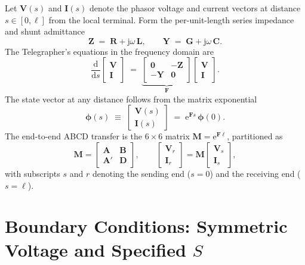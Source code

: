 \documentclass[11pt,a4paper]{article}
\newcommand{\jj}{\mathrm{j}}
\newcommand{\ee}{\mathrm{e}}
\newcommand{\diff}{\mathrm{d}}
\newcommand{\matZ}{\bm{Z}}
\newcommand{\matY}{\bm{Y}}
\newcommand{\matR}{\bm{R}}
\newcommand{\matL}{\bm{L}}
\newcommand{\matC}{\bm{C}}
\newcommand{\matG}{\bm{G}}
\newcommand{\matA}{\bm{A}}
\newcommand{\matB}{\bm{B}}
\newcommand{\matD}{\bm{D}}
\newcommand{\matM}{\bm{M}}
\newcommand{\matF}{\bm{F}}
\newcommand{\vV}{\bm{V}}
\newcommand{\vI}{\bm{I}}
\newcommand{\vphi}{\bm{\phi}}
\newcommand{\zeroM}{\bm{0}}
\begin{document}
Let \(\vV(s)\) and \(\vI(s)\) denote the phasor voltage and current vectors
at distance \(s\in[0,\ell]\) from the local terminal. Form the per-unit-length
series impedance and shunt admittance
\begin{equation}
\matZ \;=\; \matR + \jj\omega\,\matL,\qquad
\matY \;=\; \matG + \jj\omega\,\matC.
\end{equation}
The Telegrapher's equations in the frequency domain are
\begin{equation}
\frac{\diff}{\diff s}\!
\begin{bmatrix}\vV\\[2pt]\vI\end{bmatrix}
\;=\;
\underbrace{\begin{bmatrix}\zeroM & -\matZ \\[2pt] -\matY & \zeroM\end{bmatrix}}_{\matF}
\begin{bmatrix}\vV\\[2pt]\vI\end{bmatrix}.
\label{eq:state-space}
\end{equation}
The state vector at any distance follows from the matrix exponential
\begin{equation}
\vphi(s)\;\equiv\;\begin{bmatrix}\vV(s)\\[2pt]\vI(s)\end{bmatrix}
\;=\;\ee^{\matF s}\,\vphi(0).
\label{eq:propagator}
\end{equation}
The end-to-end ABCD transfer is the \(6\times 6\) matrix
\(\matM=\ee^{\matF\ell}\), partitioned as
\begin{equation}
\matM=\begin{bmatrix}\matA&\matB\\\matA'&\matD\end{bmatrix},\qquad
\begin{bmatrix}\vV_{r}\\[2pt]\vI_{r}\end{bmatrix}
=\matM\begin{bmatrix}\vV_{s}\\[2pt]\vI_{s}\end{bmatrix},
\label{eq:ABCD}
\end{equation}
with subscripts \(s\) and \(r\) denoting the sending end (\(s=0\)) and the
receiving end (\(s=\ell\)).

\section{Boundary Conditions: Symmetric Voltage and Specified \(S\)}
\end{document}
